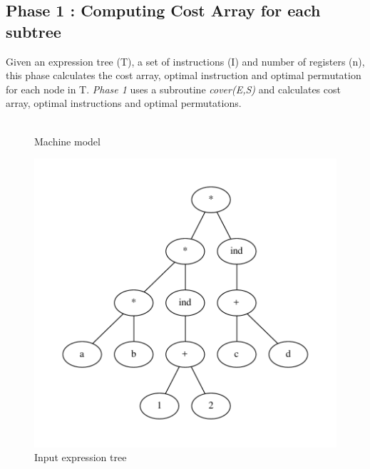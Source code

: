 \documentclass{article}
\begin{document}
\subsection{Phase 1 : Computing Cost Array for each subtree}

Given an expression tree (T), a set of instructions (I) and number of registers (n), this phase calculates the cost array, optimal instruction and optimal permutation for each node in T. \emph{Phase 1} uses a subroutine \emph{cover(E,S)} and calculates cost array, optimal instructions and optimal permutations.\\\\

\begin{figure}[!htb]
\centering
{}
\caption{Machine model}
\end{figure}

\begin{figure}[!htb]
\centering
\includegraphics[scale=0.8]{expression_tree.pdf}
\caption{Input expression tree}
\label{fig:expression}
\end{figure}
\end{document}
